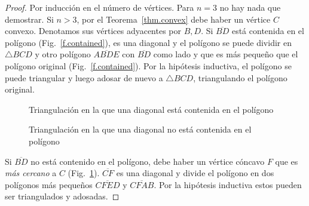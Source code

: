 \begin{proof}
Por inducción en el número de vértices. Para $n=3$ no hay nada que demostrar. Si $n>3$, por el Teorema~\ref{thm.convex} debe haber un vértice $C$ convexo. Denotamos sus vértices adyacentes por $B,D$. Si $\overline{BD}$ está contenida en el polígono (Fig.~\ref{f.contained}), es una diagonal y el polígono se puede dividir en $\triangle BCD$ y otro polígono $\overline{ABDE}$ con $\overline{BD}$ como lado y que es más pequeño que el polígono original (Fig.~\ref{f.contained}). Por la hipótesis inductiva, el polígono se puede triangular y luego adosar de nuevo a $\triangle BCD$, triangulando el polígono original.

\begin{figure}[t]
\begin{minipage}{.45\textwidth}
\begin{center}
\caption{Triangulación en la que una diagonal está contenida en el polígono}\label{f.contained}
\end{center}
\end{minipage}
\hfill
\begin{minipage}{.45\textwidth}
\begin{center}
\caption{Triangulación en la que una diagonal no está contenida en el polígono}\label{f.museum.concave-vertices}
\end{center}
\end{minipage}
\end{figure}

Si $\overline{BD}$ no está contenido en el polígono, debe haber un vértice cóncavo $F$ que es \emph{más cercano} a $C$ (Fig.~\ref{f.museum.concave-vertices}). $\overline{CF}$ es una diagonal y divide el polígono en dos polígonos más pequeños $\overline{CFED}$ y $\overline{CFAB}$. Por la hipótesis inductiva estos pueden ser triangulados y adosadas.
\end{proof}

